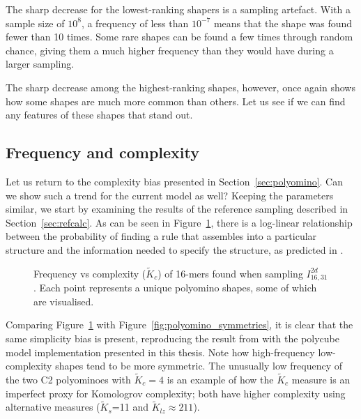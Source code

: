 The sharp decrease for the lowest-ranking shapers is a sampling artefact. With a sample size of \(10^8\), a frequency of less than \(10^{-7}\) means that the shape was found fewer than 10 times. Some rare shapes can be found a few times through random chance, giving them a much higher frequency than they would have during a larger sampling.

The sharp decrease among the highest-ranking shapes, however, once again shows how some shapes are much more common than others. Let us see if we can find any features of these shapes that stand out.

\subsection{Frequency and complexity}

Let us return to the complexity bias presented in Section~\ref{sec:polyomino}. Can we show such a trend for the current model as well? Keeping the parameters similar, we start by examining the results of the reference sampling described in Section~\ref{sec:refcalc}. As can be seen in Figure~\ref{fig:freq_vs_compl_refcalc}, there is a log-linear relationship between the probability of finding a rule that assembles into a particular structure and the information needed to specify the structure, as predicted in \cite{dingle2018input, dingle2020generic}.

\begin{figure}[h]
    \centering
    
    \caption{Frequency vs complexity (\(\widetilde{K}_c\)) of 16-mers found when sampling \(I_{16,31}^{2d}\). Each point represents a unique polyomino shapes, some of which are visualised.}
    \label{fig:freq_vs_compl_refcalc}
\end{figure}

Comparing Figure~\ref{fig:freq_vs_compl_refcalc} with Figure~\ref{fig:polyomino_symmetries}, it is clear that the same simplicity bias is present, reproducing the result from \cite{johnston2021} with the polycube model implementation presented in this thesis. Note how high-frequency low-complexity shapes tend to be more symmetric. The unusually low frequency of the two C2 polyominoes with \(\widetilde{K}_c = 4\) is an example of how the \(\widetilde{K}_c\) measure is an imperfect proxy for Komologrov complexity; both have higher complexity using alternative measures (\(\widetilde{K}_s\)=11 and \(\widetilde{K}_{lz} \approx 211\)). 

